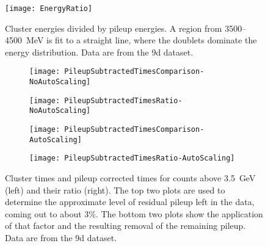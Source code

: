     \begin{figure}
        \centering
        \texttt{[image: EnergyRatio]}
        \caption[Cluster energies divided by pileup energies]{Cluster energies divided by pileup energies. A region from \SI{3500}{}--\SI{4500}{\MeV} is fit to a straight line, where the doublets dominate the energy distribution. Data are from the 9d dataset.}
        \label{fig:EnergyRatio}
    \end{figure}


    \begin{figure}
    \centering
        \begin{subfigure}[]{0.45\textwidth}
            \centering
            \texttt{[image: PileupSubtractedTimesComparison-NoAutoScaling]}
        \end{subfigure}%
        \hspace{1cm}
        \begin{subfigure}[]{0.45\textwidth}
            \centering
            \texttt{[image: PileupSubtractedTimesRatio-NoAutoScaling]}
        \end{subfigure}

        \begin{subfigure}[]{0.45\textwidth}
            \centering
            \texttt{[image: PileupSubtractedTimesComparison-AutoScaling]}
        \end{subfigure}%
        \hspace{1cm}
        \begin{subfigure}[]{0.45\textwidth}
            \centering
            \texttt{[image: PileupSubtractedTimesRatio-AutoScaling]}
        \end{subfigure}
    \caption[Cluster times above \SI{3.5}{\GeV}]{Cluster times and pileup corrected times for counts above \SI{3.5}{\GeV} (left) and their ratio (right). The top two plots are used to determine the approximate level of residual pileup left in the data, coming out to about 3\%. The bottom two plots show the application of that factor and the resulting removal of the remaining pileup. Data are from the 9d dataset.}
    \label{fig:PileupTimesRatio}
    \end{figure}



